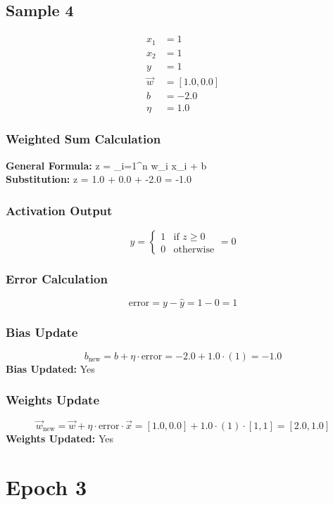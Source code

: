 \documentclass{article}
\begin{document}
\subsection*{Sample 4}
\begin{align*}
x_1 &= 1 \\
x_2 &= 1 \\
y &= 1 \\
\vec{w} &= [1.0, 0.0] \\
b &= -2.0 \\
\eta &= 1.0
\end{align*}

\subsubsection*{Weighted Sum Calculation}
\textbf{General Formula:} \quad
z = \sum_{i=1}^{n} w_i x_i + b
\\
\textbf{Substitution:} \quad
z = 1.0  + 0.0  + -2.0 = -1.0

\subsubsection*{Activation Output}
\[
\hat{y} =
\begin{cases}
1 & \text{if } z \geq 0 \\
0 & \text{otherwise}
\end{cases}
= 0
\]

\subsubsection*{Error Calculation}
\[
\text{error} = y - \hat{y} = 1 - 0 = 1
\]

\subsubsection*{Bias Update}
\[
b_{\text{new}} = b + \eta \cdot \text{error} = -2.0 + 1.0 \cdot (1) = -1.0
\]
\textbf{Bias Updated:} Yes

\subsubsection*{Weights Update}
\[
\vec{w}_{\text{new}} = \vec{w} + \eta \cdot \text{error} \cdot \vec{x} = 
[1.0, 0.0] + 1.0 \cdot (1) \cdot [1, 1] = 
[2.0, 1.0]
\]
\textbf{Weights Updated:} Yes

\section*{Epoch 3}
\end{document}
